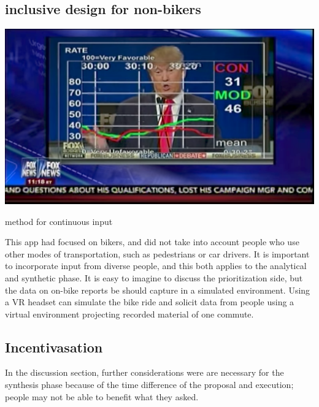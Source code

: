 \subsection{inclusive design for non-bikers}

\begin{marginfigure}[{2cm}]
 \includegraphics[width=\textwidth]{chapters/6/fig/pollester.png}  \caption{method for continuous input}
 \label{fig:poll}
\end{marginfigure}
This app had focused on bikers, and did not take into account people who use other modes of transportation, such as pedestrians or car drivers. It is important to incorporate input from diverse people, and this both applies to the analytical and synthetic phase. It is easy to imagine to discuss the prioritization side, but the data on on-bike reports be should capture in a simulated environment.
Using a VR headset can simulate the bike ride and solicit data from people using a virtual environment projecting recorded material of one commute. 

\subsection{Incentivasation}
In the discussion section, further considerations were are necessary for the synthesis phase because of the time difference of the proposal and execution; people may not be able to benefit what they asked.

